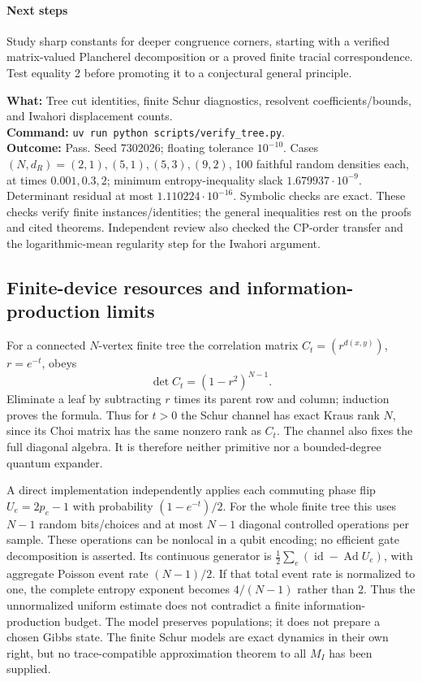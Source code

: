 \documentclass[11pt]{article}
\theoremstyle{remark}\newtheorem{remark}[definition]{Remark}
\newcommand{\id}{\operatorname{id}}
\begin{document}
\paragraph{Next steps} Study sharp constants for deeper congruence corners,
starting with a verified matrix-valued Plancherel decomposition or a proved
finite tracial correspondence. Test equality 2 before promoting it to a
conjectural general principle.
\begin{verification}
\textbf{What:} Tree cut identities, finite Schur diagnostics, resolvent
coefficients/bounds, and Iwahori displacement counts.\\
\textbf{Command:} \texttt{uv run python scripts/verify\_tree.py}.\\
\textbf{Outcome:} Pass. Seed 7302026; floating tolerance $10^{-10}$.
Cases $(N,d_R)=(2,1),(5,1),(5,3),(9,2)$, 100 faithful random densities
each, at times $0.001,0.3,2$; minimum entropy-inequality slack
$1.679937\cdot10^{-9}$. Determinant residual at most
$1.110224\cdot10^{-16}$. Symbolic checks are exact. These checks verify
finite instances/identities; the general inequalities rest on the proofs
and cited theorems. Independent review also checked the CP-order transfer
and the logarithmic-mean regularity step for the Iwahori argument.
\end{verification}

\subsection{Finite-device resources and information-production limits}
For a connected $N$-vertex finite tree the correlation matrix
$C_t=(r^{d(x,y)})$, $r=e^{-t}$, obeys
\[
 \det C_t=(1-r^2)^{N-1}.
\]
Eliminate a leaf by subtracting $r$ times its parent row and column;
induction proves the formula. Thus for $t>0$ the Schur channel has exact
Kraus rank $N$, since its Choi matrix has the same nonzero rank as $C_t$.
The channel also fixes the full diagonal algebra. It is therefore neither
primitive nor a bounded-degree quantum expander.

A direct implementation independently applies each commuting phase flip
$U_e=2p_e-1$ with probability $(1-e^{-t})/2$. For the whole finite tree
this uses $N-1$ random bits/choices and at most $N-1$ diagonal controlled
operations per sample. These operations can be nonlocal in a qubit encoding;
no efficient gate decomposition is asserted. Its continuous generator is
$\frac12\sum_e(\id-\operatorname{Ad}U_e)$, with aggregate Poisson event
rate $(N-1)/2$. If that total event rate is normalized to one, the complete
entropy exponent becomes $4/(N-1)$ rather than 2. Thus the unnormalized
uniform estimate does not contradict a finite information-production budget.
The model preserves populations; it does not prepare a chosen Gibbs state.
The finite Schur models are exact dynamics in their own right, but no
trace-compatible approximation theorem to all $M_I$ has been supplied.
\end{document}
